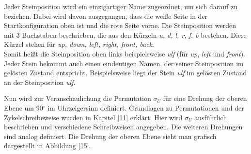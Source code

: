 \documentclass[12pt,a4paper, usenames, dvipsnames]{article}
\theoremstyle{mystyle}
\theoremstyle{definition}
\begin{document}
Jeder Steinposition wird ein einzigartiger Name zugeordnet, um sich darauf zu beziehen. Dabei wird davon ausgegangen, dass die weiße Seite in der Startkonfiguration oben ist und die rote Seite vorne. Die Steinposition werden mit 3 Buchstaben beschrieben, die aus den Kürzeln \textit{u, d, l, r, f, b} bestehen. Diese Kürzel stehen für \textit{up, down, left, right, front, back}. \\
Somit heißt die Steinposition oben links beispielsweise \textit{ulf} (für \textit{up}, \textit{left} und \textit{front}). 
Jeder Stein bekommt auch einen eindeutigen Namen, der seiner Steinposition im gelösten Zustand entspricht. Beispielsweise liegt der Stein \textit{ulf} im gelösten Zustand an der Steinposition \textit{ulf}.

Nun wird zur Veranschaulichung die Permutation $\sigma_U$ für eine Drehung der oberen Ebene um 90$^\circ$ im Uhrzeigersinn definiert. Grundlagen zu Permutationen und der Zykelschreibeweise wurden in Kapitel \ref{11} erklärt.
Hier wird $\sigma_U$ ausführlich beschrieben und verschiedene Schreibweisen angegeben. Die weiteren Drehungen sind analog definiert. 
Die Drehung der oberen Ebene sieht man grafisch dargestellt in Abbildung \ref{15}.
\end{document}
